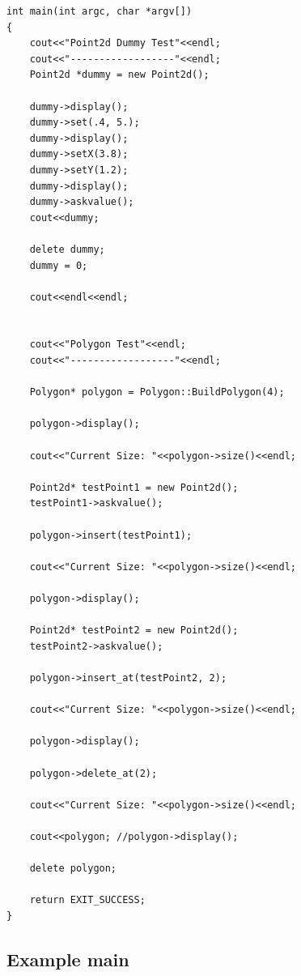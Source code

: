 \documentclass{article}
\begin{document}
\begin{lstlisting}[label=example-main,caption=main.cpp]	
int main(int argc, char *argv[])
{
    cout<<"Point2d Dummy Test"<<endl;
    cout<<"------------------"<<endl;
    Point2d *dummy = new Point2d();

    dummy->display();
    dummy->set(.4, 5.);
    dummy->display();
    dummy->setX(3.8);
    dummy->setY(1.2);
    dummy->display();
    dummy->askvalue();
    cout<<dummy;

    delete dummy;
    dummy = 0;

    cout<<endl<<endl;


    cout<<"Polygon Test"<<endl;
    cout<<"------------------"<<endl;

    Polygon* polygon = Polygon::BuildPolygon(4);

    polygon->display();

    cout<<"Current Size: "<<polygon->size()<<endl;

    Point2d* testPoint1 = new Point2d();
    testPoint1->askvalue();

    polygon->insert(testPoint1);

    cout<<"Current Size: "<<polygon->size()<<endl;

    polygon->display();

    Point2d* testPoint2 = new Point2d();
    testPoint2->askvalue();

    polygon->insert_at(testPoint2, 2);

    cout<<"Current Size: "<<polygon->size()<<endl;

    polygon->display();

    polygon->delete_at(2);

    cout<<"Current Size: "<<polygon->size()<<endl;

    cout<<polygon; //polygon->display();

    delete polygon;

    return EXIT_SUCCESS;
}

\end{lstlisting}


		\subsection{Example main}
\end{document}
